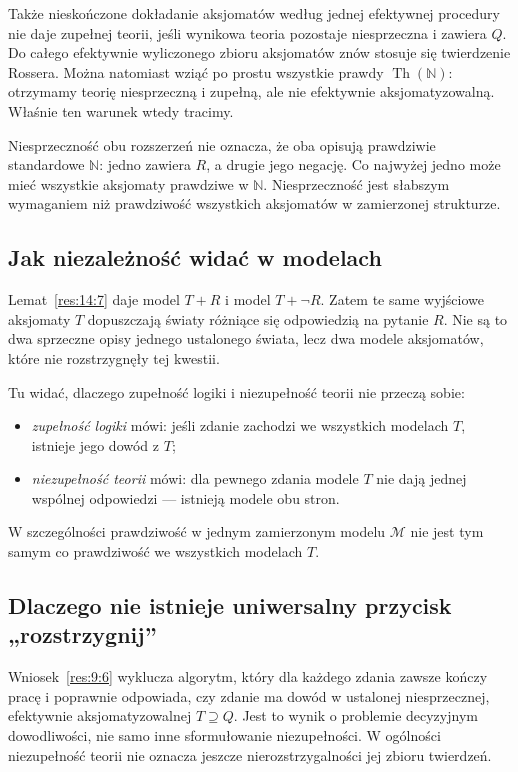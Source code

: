 \documentclass[11pt,a4paper]{article}
\numberwithin{equation}{section}
\theoremstyle{plain}
\theoremstyle{definition}
\theoremstyle{remark}
\begin{document}
Także nieskończone dokładanie aksjomatów według jednej efektywnej procedury nie daje zupełnej teorii, jeśli wynikowa teoria pozostaje niesprzeczna i zawiera $Q$. Do całego efektywnie wyliczonego zbioru aksjomatów znów stosuje się twierdzenie Rossera. Można natomiast wziąć po prostu wszystkie prawdy $\operatorname{Th}(\mathbb N)$: otrzymamy teorię niesprzeczną i zupełną, ale nie efektywnie aksjomatyzowalną. Właśnie ten warunek wtedy tracimy.

Niesprzeczność obu rozszerzeń nie oznacza, że oba opisują prawdziwie standardowe $\mathbb N$: jedno zawiera $R$, a drugie jego negację. Co najwyżej jedno może mieć wszystkie aksjomaty prawdziwe w $\mathbb N$. Niesprzeczność jest słabszym wymaganiem niż prawdziwość wszystkich aksjomatów w zamierzonej strukturze.

\subsection*{Jak niezależność widać w modelach}\label{sec:16:3}
Lemat~\ref{res:14:7} daje model $T+R$ i model $T+\neg R$. Zatem te same wyjściowe aksjomaty $T$ dopuszczają światy różniące się odpowiedzią na pytanie $R$. Nie są to dwa sprzeczne opisy jednego ustalonego świata, lecz dwa modele aksjomatów, które nie rozstrzygnęły tej kwestii.

Tu widać, dlaczego zupełność logiki i niezupełność teorii nie przeczą sobie:
\begin{itemize}
\item \emph{zupełność logiki} mówi: jeśli zdanie zachodzi we wszystkich modelach $T$, istnieje jego dowód z $T$;
\item \emph{niezupełność teorii} mówi: dla pewnego zdania modele $T$ nie dają jednej wspólnej odpowiedzi --- istnieją modele obu stron.
\end{itemize}
W szczególności prawdziwość w jednym zamierzonym modelu $\mathcal M$ nie jest tym samym co prawdziwość we wszystkich modelach $T$.

\subsection*{Dlaczego nie istnieje uniwersalny przycisk „rozstrzygnij”}\label{sec:16:4}
Wniosek~\ref{res:9:6} wyklucza algorytm, który dla każdego zdania zawsze kończy pracę i poprawnie odpowiada, czy zdanie ma dowód w ustalonej niesprzecznej, efektywnie aksjomatyzowalnej $T\supseteq Q$. Jest to wynik o problemie decyzyjnym dowodliwości, nie samo inne sformułowanie niezupełności. W ogólności niezupełność teorii nie oznacza jeszcze nierozstrzygalności jej zbioru twierdzeń.
\end{document}
